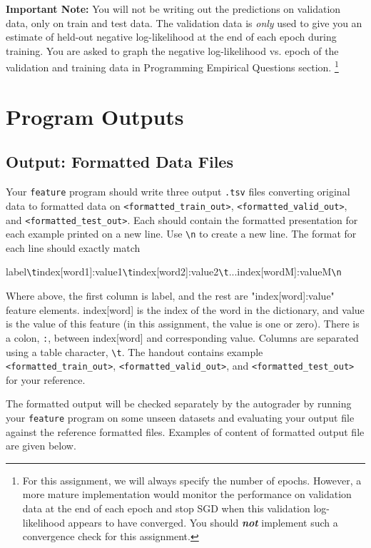 \documentclass[11pt,addpoints,answers]{exam}
\begin{document}
\begin{notebox}
{\bf Important Note:} You will not be writing out the predictions on validation data, only on train and test data. The validation data is \emph{only} used to give you an estimate of held-out negative log-likelihood at the end of each epoch during training. You are asked to graph the negative log-likelihood vs. epoch of the validation and training data in Programming Empirical Questions section. \footnote{For this assignment, we will always specify the number of epochs. However, a more mature implementation would monitor the performance on validation data at the end of each epoch and stop SGD when this validation log-likelihood appears to have converged. You should \textbf{\emph{not}} implement such a convergence check for this assignment.} 
\end{notebox}

\section{Program Outputs}

\subsection{Output: Formatted Data Files} \label{format_output}
Your \lstinline{feature} program should write three output \texttt{.tsv} files converting original data to formatted data on \texttt{<formatted\_train\_out>}, \texttt{<formatted\_valid\_out>}, and \texttt{<formatted\_test\_out>}. Each should contain the formatted presentation for each example printed on a new line. Use \lstinline{\n} to create a new line. The format for each line should exactly match 

label\lstinline{\t}index[word1]:value1\lstinline{\t}index[word2]:value2\lstinline{\t}...index[wordM]:valueM\lstinline{\n}

Where above, the first column is label, and the rest are "index[word]:value" feature elements. index[word] is the index of the word in the dictionary, and value is the value of this feature (in this assignment, the value is one or zero). There is a colon, \lstinline{:}, between index[word] and corresponding value. Columns are separated using a table character, \lstinline{\t}. The handout contains example \texttt{<formatted\_train\_out>}, \newline \texttt{<formatted\_valid\_out>}, and \texttt{<formatted\_test\_out>} for your reference.

The formatted output will be checked separately by the autograder by running your \lstinline{feature} program on some unseen datasets and evaluating your output file against the reference formatted files. Examples of content of formatted output file are given below.
\end{document}
